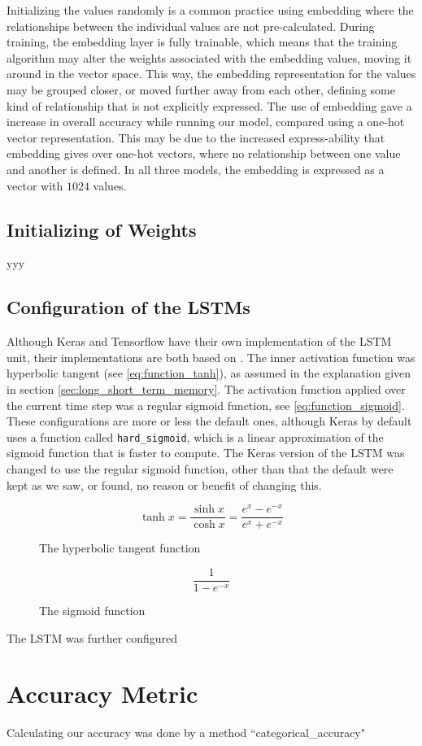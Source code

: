Initializing the values randomly is a common practice using embedding where the relationships between the individual values are not pre-calculated. During training, the embedding layer is fully trainable, which means that the training algorithm may alter the weights associated with the embedding values, moving it around in the vector space. This way, the embedding representation for the values may be grouped closer, or moved further away from each other, defining some kind of relationship that is not explicitly expressed. The use of embedding gave a increase in overall accuracy while running our model, compared using a one-hot vector representation. This may be due to the increased express-ability that embedding gives over one-hot vectors, where no relationship between one value and another is defined. In all three models, the embedding is expressed as a vector with \(1024\) values.

\subsection{Initializing of Weights}
yyy

\subsection{Configuration of the LSTMs}
Although Keras and Tensorflow have their own implementation of the LSTM unit, their implementations are both based on \citep{hochreiter1997long}. The inner activation function was hyperbolic tangent (see \ref{eq:function_tanh}), as assumed in the explanation given in section \ref{sec:long_short_term_memory}. The activation function applied over the current time step was a regular sigmoid function, see \ref{eq:function_sigmoid}. These configurations are more or less the default ones, although Keras by default uses a function called {\tt hard\_sigmoid}, which is a linear approximation of the sigmoid function that is faster to compute. The Keras version of the LSTM was changed to use the regular sigmoid function, other than that the default were kept as we saw, or found, no reason or benefit of changing this.

\begin{figure}[ht]
    \centering
    \begin{minipage}{.5\textwidth}
      \begin{equation}
        \label{eq:function_tanh}
        \tanh{x} = \frac{\sinh{x}}{\cosh{x}} = \frac{e^{x}-e^{-x}}{e^{x}+e^{-x}}
      \end{equation}
      \captionsetup{labelformat=empty}
      \caption{The hyperbolic tangent function}
    \end{minipage}%
    \begin{minipage}{.5\textwidth}
      \begin{equation}
        \label{eq:function_sigmoid}
        \frac{1}{1-e^{-x}}
      \end{equation}
      \captionsetup{labelformat=empty}
      \caption{The sigmoid function}
    \end{minipage}
\end{figure}

The LSTM was further configured 


\section{Accuracy Metric}
Calculating our accuracy was done by a method ``categorical\_accuracy"